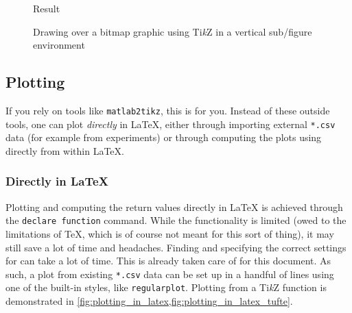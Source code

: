 \begin{figure}
{\begin{subfloatrow}
{{
            }{
                \caption{Result}
                \label{fig:bitmap_tikz_result}
            }
        }
        \end{subfloatrow}
    }{%
        \caption{%
            Drawing over a bitmap graphic using Ti\textit{k}Z in a vertical sub\-/figure
            environment%
        }
        \label{fig:bitmap_tikz}
    }
\end{figure}

\subsection{Plotting}

If you rely on tools like \texttt{matlab2tikz}, this is for you.
Instead of these outside tools, one can plot \emph{directly} in \LaTeX{}, either
through importing external \texttt{*.csv} data (for example from experiments)
or through computing the plots using  directly from within
\LaTeX{}.

\subsubsection{Directly in \LaTeX{}}
Plotting and computing the return values directly in \LaTeX{} is achieved through
the \texttt{declare function} command.
While the functionality is limited (owed to the limitations of \TeX{}, which is
of course not meant for this sort of thing),
it may still save a lot of time and headaches.
Finding and specifying the correct settings for  can take
a lot of time.
This is already taken care of for this document.
As such, a plot from existing \texttt{*.csv} data can be set up in a handful of
lines using one of the built-in styles, like \texttt{regularplot}.
Plotting from a Ti\textit{k}Z function is demonstrated in
\cref{fig:plotting_in_latex,fig:plotting_in_latex_tufte}.

